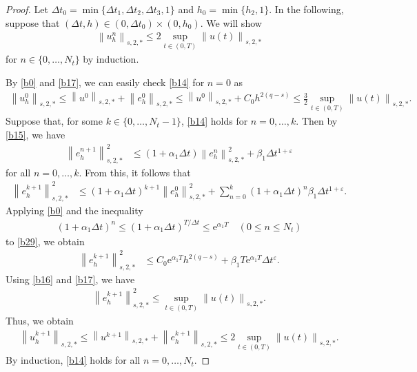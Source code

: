 \documentclass[10pt,a4paper,tbtags,leqno]{amsart}
\theoremstyle{definition}
\numberwithin{equation}{section}
\def\norm#1#2{\left\|#2\right\|_{#1}}
\begin{document}
\begin{proof}
  Let $ \Delta t_0 = \min\{\Delta t_1, \Delta t_2, \Delta t_3, 1\} $ and $ h_0 = \min \{h_2, 1\} $. In the following, suppose that $ (\Delta t, h) \in (0, \Delta t_0) \times (0, h_0) $. We will show 
  \begin{align}
    \norm{s, 2, \ast}{u_h^n} \leq 2 \sup_{t\in (0, T)} \norm{s, 2, \ast}{u (t)}
    \label{b14}
  \end{align}
  for $ n \in \{0, \ldots, N_t\} $ by induction. 

  By \eqref{b0} and \eqref{b17}, we can easily check \eqref{b14} for $ n = 0 $ as 
  \begin{align} 
    \norm{s, 2, \ast}{u_h^0} \leq \norm{s, 2, \ast}{u^0} + \norm{s, 2, \ast}{e_h^0} \leq \norm{s, 2, \ast}{u^0} + C_0 h^{2 (q - s)} \leq \frac{3}{2} \sup_{t\in (0, T)} \norm{s, 2, \ast}{u (t)}. 
  \end{align}
  Suppose that, for some $ k \in \{0, \ldots, N_t - 1\} $, \eqref{b14} holds for $ n = 0, \ldots, k $. 
  Then by \eqref{b15}, we have 
  \begin{align} 
    \norm{s, 2, \ast}{e_h^{n + 1}}^2 & \leq \left(1 + \alpha_1 \Delta t \right) \norm{s, 2, \ast}{e_h^n}^2 + \beta_1 \Delta t^{1 + \varepsilon} 
  \end{align} 
  for all $ n = 0, \ldots, k $. From this, it follows that 
  \begin{align}
    \norm{s, 2, \ast}{e_h^{k + 1}}^2 
    & \leq \left(1 + \alpha_1 \Delta t \right)^{k + 1} \norm{s, 2, \ast}{e_h^0}^2 
    + \sum_{n = 0}^{k} \left(1 + \alpha_1 \Delta t \right)^{n} \beta_1 \Delta t^{1 + \varepsilon}. 
    \label{b29}
  \end{align}
  Applying \eqref{b0} and the inequality 
  \begin{align}
    \left(1 + \alpha_1 \Delta t \right)^{n} \leq \left(1 + \alpha_1 \Delta t \right)^{T / \Delta t} \leq \mathrm{e}^{\alpha_1 T} \quad (0 \leq n \leq N_t)
  \end{align}
  to \eqref{b29}, we obtain 
  \begin{align} 
    \norm{s, 2, \ast}{e_h^{k + 1}}^2 
    & \leq C_0 \mathrm{e}^{\alpha_1 T} h^{2 (q - s)}
    + \beta_1 T \mathrm{e}^{\alpha_1 T} \Delta t^{\varepsilon}. 
  \end{align} 
  Using \eqref{b16} and \eqref{b17}, we have 
  \begin{align} 
    \norm{s, 2, \ast}{e_h^{k + 1}}^2 \leq \sup_{t\in (0, T)} \norm{s, 2, \ast}{u (t)}. 
  \end{align} 
  Thus, we obtain 
  \begin{align} 
    \norm{s, 2, \ast}{u_h^{k + 1}} \leq \norm{s, 2, \ast}{u^{k + 1}} + \norm{s, 2, \ast}{e_h^{k + 1}} \leq 2 \sup_{t\in (0, T)} \norm{s, 2, \ast}{u (t)}. 
  \end{align} 
  By induction, \eqref{b14} holds for all $ n = 0,\ldots, N_t $. 


\end{proof}
\end{document}
